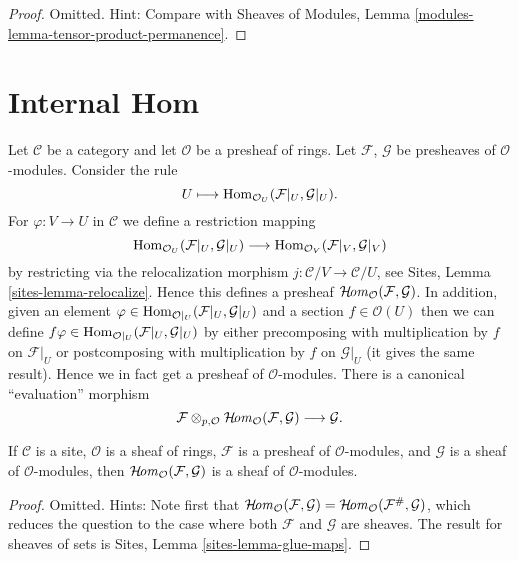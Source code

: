 \begin{proof}
Omitted. Hint: Compare with
Sheaves of Modules, Lemma \ref{modules-lemma-tensor-product-permanence}.
\end{proof}



\section{Internal Hom}
\label{section-internal-hom}

\noindent
Let $\mathcal{C}$ be a category and let $\mathcal{O}$ be a presheaf
of rings. Let $\mathcal{F}$, $\mathcal{G}$ be presheaves of
$\mathcal{O}$-modules. Consider the rule
$$
U \longmapsto \mathop{\rm Hom}\nolimits_{\mathcal{O}_U}(\mathcal{F}|_U, \mathcal{G}|_U).
$$
For $\varphi : V \to U$ in $\mathcal{C}$ we define a restriction mapping
$$
\mathop{\rm Hom}\nolimits_{\mathcal{O}_U}(\mathcal{F}|_U, \mathcal{G}|_U)
\longrightarrow
\mathop{\rm Hom}\nolimits_{\mathcal{O}_V}(\mathcal{F}|_V, \mathcal{G}|_V)
$$
by restricting via the relocalization morphism
$j : \mathcal{C}/V \to \mathcal{C}/U$, see
Sites, Lemma \ref{sites-lemma-relocalize}. Hence this defines a
presheaf $\mathop{\mathcal{H}\!{\it om}}\nolimits_\mathcal{O}(\mathcal{F}, \mathcal{G})$.
In addition, given an element
$\varphi \in \mathop{\rm Hom}\nolimits_{\mathcal{O}|_U}(\mathcal{F}|_U, \mathcal{G}|_U)$
and a section $f \in \mathcal{O}(U)$ then we can define
$f\varphi \in \mathop{\rm Hom}\nolimits_{\mathcal{O}|_U}(\mathcal{F}|_U, \mathcal{G}|_U)$
by either precomposing with multiplication by $f$ on $\mathcal{F}|_U$
or postcomposing with multiplication by $f$ on $\mathcal{G}|_U$ (it gives
the same result). Hence we in fact get a presheaf of $\mathcal{O}$-modules.
There is a canonical ``evaluation'' morphism
$$
\mathcal{F}
\otimes_{p, \mathcal{O}}
\mathop{\mathcal{H}\!{\it om}}\nolimits_\mathcal{O}(\mathcal{F}, \mathcal{G})
\longrightarrow
\mathcal{G}.
$$

\begin{lemma}
\label{lemma-internal-hom}
If $\mathcal{C}$ is a site, $\mathcal{O}$ is a sheaf of rings,
$\mathcal{F}$ is a presheaf of $\mathcal{O}$-modules, and
$\mathcal{G}$ is a sheaf of $\mathcal{O}$-modules, then
$\mathop{\mathcal{H}\!{\it om}}\nolimits_\mathcal{O}(\mathcal{F}, \mathcal{G})$
is a sheaf of $\mathcal{O}$-modules.
\end{lemma}

\begin{proof}
Omitted. Hints: Note first that
$\mathop{\mathcal{H}\!{\it om}}\nolimits_\mathcal{O}(\mathcal{F}, \mathcal{G})
= \mathop{\mathcal{H}\!{\it om}}\nolimits_\mathcal{O}(\mathcal{F}^\#, \mathcal{G})$, which reduces
the question to the case where both $\mathcal{F}$ and $\mathcal{G}$
are sheaves. The result for sheaves of sets is
Sites, Lemma \ref{sites-lemma-glue-maps}.
\end{proof}

